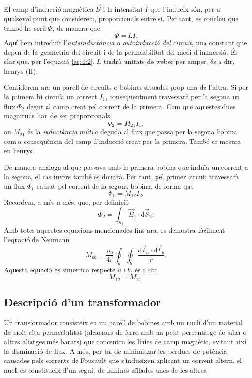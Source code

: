\documentclass[a4paper,10.5pt]{report}
\begin{document}
El camp d'inducció magnètica $\Vec{B}$ i la intensitat $I$ que l'indueix són, per a qualsevol punt que considerem, proporcionals entre si. Per tant, es conclou que també ho serà $\Phi$, de manera que
\begin{equation}
	\Phi=LI \label{eq:4:2}.
\end{equation}
Aquí hem introduït l'\textit{autoinductància} o \textit{autoinducció del circuit}, una constant que depèn de la geometria del circuit i de la permeabilitat del medi d'immersió. És clar que, per l'equació \eqref{eq:4:2}, $L$ tindrà unitats de weber per amper, és a dir, henrys (H).

Considerem ara un parell de circuits o bobines situades prop una de l'altra. Si per la primera hi circula un corrent $I_1$, conseqüentment travessarà per la segona un flux $\Phi_2$ degut al camp creat pel corrent de la primera. Com que aquestes dues magnituds han de ser proporcionals
\begin{equation}
	\Phi_2=M_{21}I_1 \label{eq:4:3},
\end{equation}
on $M_{21}$ és la \textit{inductància mútua} deguda al flux que passa per la segona bobina com a conseqüència del camp d'inducció creat per la primera. També es mesura en henrys. 

De manera anàloga al que passava amb la primera bobina que induïa un corrent a la segona, el cas invers també es donarà. Per tant, pel primer circuit travessarà un flux $\Phi_1$ causat pel corrent de la segona bobina, de forma que
\begin{equation}
	\Phi_1=M_{12}I_2 \label{eq:4:4}.
\end{equation}
Recordem, a més a més, que, per definició
\begin{equation}
	\Phi_2=\int_{S_2}\vec{B}_1 \cdot \mathrm{d}\Vec{S}_2 \label{eq:4:5}.
\end{equation}
Amb totes aquestes equacions mencionades fins ara, es demostra fàcilment l'equació de Neumann
\begin{equation}
	M_{ab}=\frac{\mu_0}{4\pi}\oint_a\oint_b\frac{\mathrm{d}\Vec{l}_a\cdot\mathrm{d}\Vec{l}_b}{r} \label{eq:4:6}.
\end{equation}
Aquesta equació és simètrica respecte $a$ i $b$, és a dir
\begin{equation}
	M_{12}=M_{21}. \label{eq:4:7}
\end{equation}

\subsection{Descripció d'un transformador}
Un transformador consisteix en un parell de bobines amb un nucli d'un material de molt alta permeabilitat (aleacions de ferro amb un petit percentatge de silici o altres aliatges més barats) que concentra les línies de camp magnètic, evitant així la disminució de flux. A més, per tal de minimitzar les pèrdues de potència causades pels corrents de Foucault que s'indueixen aplicant un corrent altern, el nucli es constitueix d'un seguit de làmines aïllades unes de les altres. 
\end{document}
